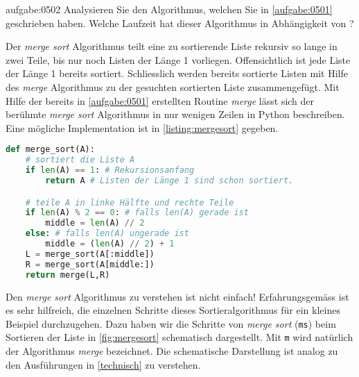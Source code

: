 \begin{aufgabe}{aufgabe:0502}
Analysieren Sie den Algorithmus, welchen Sie in \cref{aufgabe:0501} geschrieben haben. Welche Laufzeit hat dieser Algorithmus in Abhängigkeit von ?
\end{aufgabe}
\noindent
Der \textit{merge sort} Algorithmus teilt eine zu sortierende Liste rekursiv so lange in zwei Teile, bis nur noch Listen der Länge 1 vorliegen. Offensichtlich ist jede Liste der Länge 1 bereits sortiert. Schliesslich werden bereits sortierte Listen mit Hilfe des \textit{merge} Algorithmus zu der gesuchten sortierten Liste zusammengefügt. Mit Hilfe der bereits in \cref{aufgabe:0501} erstellten Routine \textit{merge} lässt sich der berühmte \textit{merge sort} Algorithmus in nur wenigen Zeilen in Python beschreiben. Eine mögliche Implementation ist in \cref{listing:mergesort} gegeben.
\begin{lstlisting}[language=Python,caption=Implementation der Funktion \pythoninline{merge_sort},label=listing:mergesort]
def merge_sort(A):
    # sortiert die Liste A
    if len(A) == 1: # Rekursionsanfang
        return A # Listen der Länge 1 sind schon sortiert.

    # teile A in linke Hälfte und rechte Teile
    if len(A) % 2 == 0: # falls len(A) gerade ist
        middle = len(A) // 2
    else: # falls len(A) ungerade ist
        middle = (len(A) // 2) + 1
    L = merge_sort(A[:middle])
    R = merge_sort(A[middle:])
    return merge(L,R)
\end{lstlisting} 
Den \textit{merge sort} Algorithmus zu verstehen ist nicht einfach! Erfahrungsgemäss ist es sehr hilfreich, die einzelnen Schritte dieses Sortieralgorithmus für ein kleines Beispiel durchzugehen. Dazu haben wir die Schritte von \textit{merge sort} (\verb|ms|) beim Sortieren der Liste \pythoninline{[3,2,1]} in \cref{fig:mergesort} schematisch dargestellt. Mit \verb|m| wird natürlich der Algorithmus \textit{merge} bezeichnet. Die schematische Darstellung ist analog zu den Ausführungen in \cref{technisch} zu verstehen.
